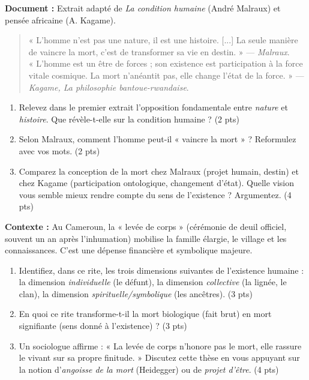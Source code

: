 \documentclass[11pt]{article}
\begin{document}
\begin{exercice}
\textbf{Document :} Extrait adapté de \textit{La condition humaine} (André Malraux) et pensée africaine (A. Kagame).
\begin{quote}
« L'homme n'est pas une nature, il est une histoire. [...] La seule manière de vaincre la mort, c'est de transformer sa vie en destin. » — \textit{Malraux}. \\
« L'homme est un être de forces ; son existence est participation à la force vitale cosmique. La mort n'anéantit pas, elle change l'état de la force. » — \textit{Kagame, La philosophie bantoue-rwandaise}.
\end{quote}
\begin{enumerate}
    \item Relevez dans le premier extrait l'opposition fondamentale entre \textit{nature} et \textit{histoire}. Que révèle-t-elle sur la condition humaine ? (2 pts)
    \item Selon Malraux, comment l'homme peut-il « vaincre la mort » ? Reformulez avec vos mots. (2 pts)
    \item Comparez la conception de la mort chez Malraux (projet humain, destin) et chez Kagame (participation ontologique, changement d'état). Quelle vision vous semble mieux rendre compte du sens de l'existence ? Argumentez. (4 pts)
\end{enumerate}
\end{exercice}

\begin{exercice}
\textbf{Contexte :} Au Cameroun, la « levée de corps » (cérémonie de deuil officiel, souvent un an après l'inhumation) mobilise la famille élargie, le village et les connaissances. C'est une dépense financière et symbolique majeure.
\begin{enumerate}
    \item Identifiez, dans ce rite, les trois dimensions suivantes de l'existence humaine : la dimension \textit{individuelle} (le défunt), la dimension \textit{collective} (la lignée, le clan), la dimension \textit{spirituelle/symbolique} (les ancêtres). (3 pts)
    \item En quoi ce rite transforme-t-il la mort biologique (fait brut) en mort signifiante (sens donné à l'existence) ? (3 pts)
    \item Un sociologue affirme : « La levée de corps n'honore pas le mort, elle rassure le vivant sur sa propre finitude. » Discutez cette thèse en vous appuyant sur la notion d'\textit{angoisse de la mort} (Heidegger) ou de \textit{projet d'être}. (4 pts)
\end{enumerate}
\end{exercice}
\end{document}
